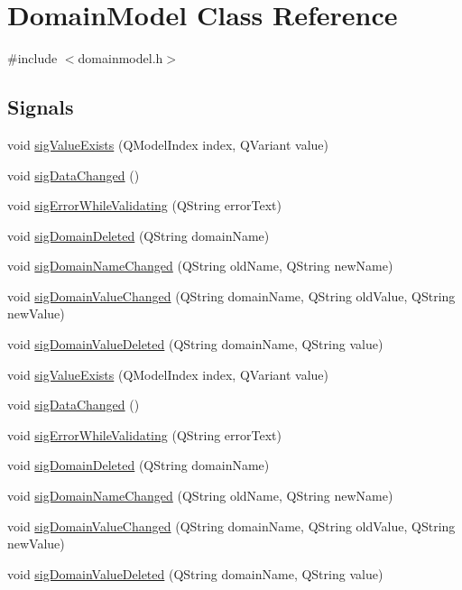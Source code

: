\hypertarget{class_domain_model}{
\section{DomainModel Class Reference}
\label{class_domain_model}
}


{\ttfamily \#include $<$domainmodel.h$>$}

\subsection*{Signals}
\begin{DoxyCompactItemize}
\item 
void \hyperlink{class_domain_model_ab4ae8aa3336c8308a172c97d9e288e60}{sigValueExists} (QModelIndex index, QVariant value)
\item 
void \hyperlink{class_domain_model_a52695bb18591824f8a4bd675ea1a869e}{sigDataChanged} ()
\item 
void \hyperlink{class_domain_model_a5931cd54a1b74bc94b4dfe3b37b71275}{sigErrorWhileValidating} (QString errorText)
\item 
void \hyperlink{class_domain_model_ab5ef42f1a6eefc546531f24f5afa3604}{sigDomainDeleted} (QString domainName)
\item 
void \hyperlink{class_domain_model_af87a447e5be936b000d27959d4a03f62}{sigDomainNameChanged} (QString oldName, QString newName)
\item 
void \hyperlink{class_domain_model_a53602074e4054879e00a484b7c349375}{sigDomainValueChanged} (QString domainName, QString oldValue, QString newValue)
\item 
void \hyperlink{class_domain_model_ad937dfd63b21f1ab66dccbb9eeda5028}{sigDomainValueDeleted} (QString domainName, QString value)
\item 
void \hyperlink{class_domain_model_ab4ae8aa3336c8308a172c97d9e288e60}{sigValueExists} (QModelIndex index, QVariant value)
\item 
void \hyperlink{class_domain_model_a52695bb18591824f8a4bd675ea1a869e}{sigDataChanged} ()
\item 
void \hyperlink{class_domain_model_a5931cd54a1b74bc94b4dfe3b37b71275}{sigErrorWhileValidating} (QString errorText)
\item 
void \hyperlink{class_domain_model_ab5ef42f1a6eefc546531f24f5afa3604}{sigDomainDeleted} (QString domainName)
\item 
void \hyperlink{class_domain_model_af87a447e5be936b000d27959d4a03f62}{sigDomainNameChanged} (QString oldName, QString newName)
\item 
void \hyperlink{class_domain_model_a53602074e4054879e00a484b7c349375}{sigDomainValueChanged} (QString domainName, QString oldValue, QString newValue)
\item 
void \hyperlink{class_domain_model_ad937dfd63b21f1ab66dccbb9eeda5028}{sigDomainValueDeleted} (QString domainName, QString value)
\end{DoxyCompactItemize}
